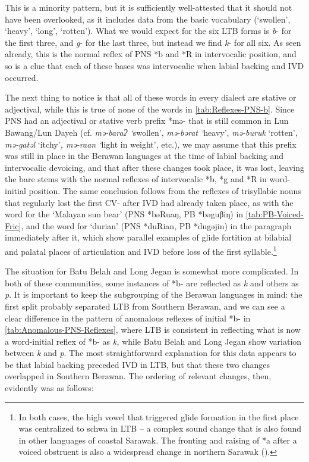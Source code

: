 \documentclass[output=paper]{langscibook}
\begin{document}
This is a minority pattern, but it is sufficiently well-attested that it should not have been overlooked, as it includes data from the basic vocabulary (‘swollen’, ‘heavy', ‘long’, ‘rotten’).  What we would expect for the six LTB forms is \textit{b}- for the first three, and \textit{g}- for the last three, but instead we find \textit{k}- for all six. As seen already, this is the normal reflex of PNS *b and *R in intervocalic position, and so is a clue that each of these bases was intervocalic when labial backing and IVD occurred.

The next thing to notice is that all of these words in every dialect are stative or adjectival, while this is true of none of the words in \cref{tab:Reflexes-PNS-b}. Since PNS had an adjectival or stative verb prefix *mə- that is still common in Lun Bawang/Lun Dayeh (cf. \textit{mə-baraɁ ‘}swollen’, \textit{mə-bərat ‘}heavy’, \textit{mə-buruk} ‘rotten’, \textit{mə-gatəl} ‘itchy’\textit{, mə-raan ‘}light in weight’, etc.), we may assume that this prefix was still in place in the Berawan languages at the time of labial backing and intervocalic devoicing, and that after these changes took place, it was lost, leaving the bare stems with the normal reflexes of intervocalic *b, *g and *R in word-initial position. The same conclusion follows from the reflexes of trisyllabic nouns that regularly lost the first CV- after IVD had already taken place, as with the word for the ‘Malayan sun bear’  (PNS *bəRuaŋ, PB *bəguβiŋ) in \cref{tab:PB-Voiced-Fric}, and the word for ‘durian’ (PNS *duRian, PB *dugəjin) in the paragraph immediately after it, which show parallel examples of glide fortition at bilabial and palatal places of articulation and IVD before loss of the first syllable.\footnote{In both cases, the high vowel that triggered glide formation in the first place was centralized to schwa in LTB -- a complex sound change that is also found in other languages of coastal Sarawak. The fronting and raising of *a after a voiced obstruent is also a widespread change in northern Sarawak (\citealt{Blust2000,Blust2020}).}

The situation for Batu Belah and Long Jegan is somewhat more complicated. In both of these communities, some instances of *b- are reflected as \textit{k} and others as \textit{p}. It is important to keep the subgrouping of the Berawan languages in mind: the first split probably separated LTB from Southern Berawan, and we can see a clear difference in the pattern of anomalous reflexes of initial *b- in \cref{tab:Anomalous-PNS-Reflexes}, where LTB is consistent in reflecting what is now a word-initial reflex of *b- as \textit{k,} while Batu Belah and Long Jegan show variation between \textit{k} and \textit{p}. The most straightforward explanation for this data appears to be that labial backing preceded IVD in LTB, but that these two changes overlapped in Southern Berawan. The ordering of relevant changes, then, evidently was as follows:
\end{document}
